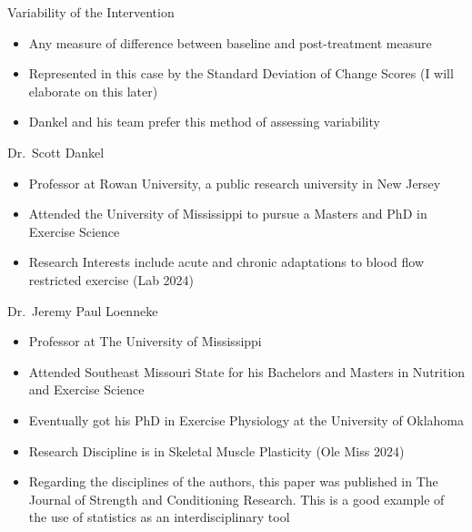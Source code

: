 \documentclass[
  ignorenonframetext,
  aspectratio=169,
]{beamer}
\providecommand{\tightlist}{%
  \setlength{\itemsep}{0pt}\setlength{\parskip}{0pt}}
\begin{document}
\begin{frame}{Variability of the Intervention}
\protect\hypertarget{variability-of-the-intervention}{}
\begin{itemize}
\tightlist
\item
  Any measure of difference between baseline and post-treatment measure
\item
  Represented in this case by the Standard Deviation of Change Scores (I
  will elaborate on this later)
\item
  Dankel and his team prefer this method of assessing variability
\end{itemize}
\end{frame}

\begin{frame}{Dr.~Scott Dankel}
\protect\hypertarget{dr.-scott-dankel}{}
\begin{itemize}
\tightlist
\item
  Professor at Rowan University, a public research university in New
  Jersey
\item
  Attended the University of Mississippi to pursue a Masters and PhD in
  Exercise Science
\item
  Research Interests include acute and chronic adaptations to blood flow
  restricted exercise (Lab 2024)
\end{itemize}
\end{frame}

\begin{frame}{Dr.~Jeremy Paul Loenneke}
\protect\hypertarget{dr.-jeremy-paul-loenneke}{}
\begin{itemize}
\item
  Professor at The University of Mississippi
\item
  Attended Southeast Missouri State for his Bachelors and Masters in
  Nutrition and Exercise Science
\item
  Eventually got his PhD in Exercise Physiology at the University of
  Oklahoma
\item
  Research Discipline is in Skeletal Muscle Plasticity (Ole Miss 2024)
\item
  Regarding the disciplines of the authors, this paper was published in
  The Journal of Strength and Conditioning Research. This is a good
  example of the use of statistics as an interdisciplinary tool
\end{itemize}
\end{frame}
\end{document}
